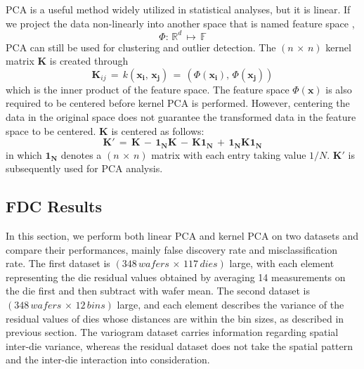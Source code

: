 \documentclass[english]{article}
\numberwithin{equation}{section}
\numberwithin{table}{section}
\numberwithin{figure}{section}
\begin{document}
PCA is a useful method widely utilized in statistical analyses, but
it is linear. If we project the data non-linearly into another space
that is named feature space \cite{kpca}, 
\begin{equation}
\Phi:\,\mathbb{R}^{d}\,\longmapsto\,\mathbb{F}
\end{equation}
PCA can still be used for clustering and outlier detection. The $(n\,\times\, n)$
kernel matrix $\mathbf{K}$ is created through
\begin{equation}
\mathbf{K}_{ij}\,=\, k(\mathbf{x_{i}},\,\mathbf{x_{j}})\,=\,(\Phi(\mathbf{x_{i}}),\,\Phi(\mathbf{x_{j}}))
\end{equation}
which is the inner product of the feature space. The feature space
$\Phi(\mathbf{x})$ is also required to be centered before kernel
PCA is performed. However, centering the data in the original space
does not guarantee the transformed data in the feature space to be
centered. $\mathbf{K}$ is centered as follows:
\begin{equation}
\mathbf{K}'\,=\,\mathbf{K}\,-\,\mathbf{1_{N}K}\,-\,\mathbf{K1_{N}}\,+\,\mathbf{1_{N}K1_{N}}
\end{equation}
in which $\mathbf{1_{N}}$ denotes a $(n\,\times\, n)$ matrix with
each entry taking value $1/N$. $\mathbf{K}'$ is subsequently used
for PCA analysis.


\subsection{FDC Results} \label{kernres}
\hspace{12 pt}
In this section, we perform both linear PCA and kernel PCA on two
datasets and compare their performances, mainly false discovery rate
and misclassification rate. The first dataset is $(348\, wafers\,\times\,117\, dies)$
large, with each element representing the die residual values obtained
by averaging 14 measurements on the die first and then subtract with
wafer mean. The second dataset is $(348\, wafers\,\times\,12\, bins)$
large, and each element describes the variance of the residual values
of dies whose distances are within the bin sizes, as described in
previous section. The variogram dataset carries information regarding
spatial inter-die variance, whereas the residual dataset does not
take the spatial pattern and the inter-die interaction into consideration.
\end{document}
